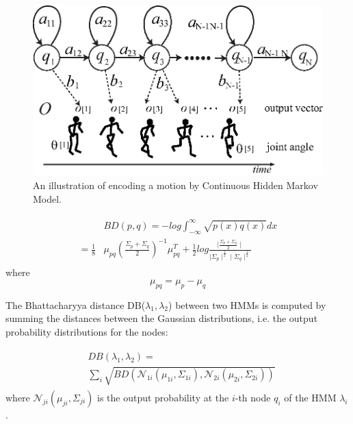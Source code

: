 \begin{figure}[t!]
  \centering
  \includegraphics[width=12cm]{./fig_cha5/chmm.eps}
  \caption{{An illustration of encoding a motion by Continuous Hidden Markov Model\protect\footnotemark.}
}
    \label{fig:chmm}
\end{figure}


\begin{align}
\begin{split}
&BD(p,q) = -log\int^{\infty}_{-\infty}\sqrt{p(x)q(x)}dx \\
=\frac{1}{8}&\mu_{pq}\left({\frac{\Sigma_p+\Sigma_q}{2}}\right)^{-1}\mu_{pq}^T +\frac{1}{2}log{\frac{\mid\frac{\Sigma_p+\Sigma_q}{2}\mid}{\mid\Sigma_p\mid^{\frac{1}{2}}\mid \Sigma_q\mid^{\frac{1}{2}}}}
\end{split}
\end{align}
where
\begin{equation}
\mu_{pq} = \mu_p - \mu_q
\end{equation}

The Bhattacharyya distance DB($\lambda_1, \lambda_2$) between two HMMs is computed by summing the distances between the Gaussian distributions, i.e. the output probability distributions for the nodes:

\begin{align}
\begin{split}
&DB(\lambda_1, \lambda_2) = \\
&\sum_i\sqrt{BD\left(\mathcal{N}_{1i}\left(\mu_{1i},\Sigma_{1i}\right), \mathcal{N}_{2i}\left(\mu_{2i},\Sigma_{2i}\right)\right)}
\end{split}
\end{align}
where $\mathcal{N}_{ji}(\mu_{ji},\Sigma_{ji})$ is the output probability at the $i$-th node $q_i$ of the HMM $\lambda_i$.

